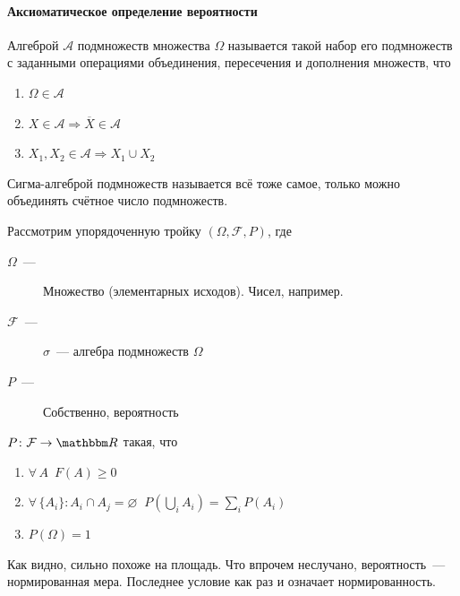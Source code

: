 \documentclass[12pt,timbord]{../../../notes}
\begin{document}
\paragraph{Аксиоматическое определение вероятности}
\label{par:prob::ax}

\begin{defn}\label{defn:prob::ax::sigmalg}
  Алгеброй $\mathcal A$ подмножеств множества $\Omega$ называется такой набор его подмножеств с
  заданными операциями объединения, пересечения и дополнения множеств, что
  \begin{enumerate}
    \item $\Omega \in \mathcal A$
    \item $X\in \mathcal A \Rightarrow \overline{X} \in \mathcal A$
    \item $X_1, X_2 \in \mathcal A \Rightarrow X_1 \cup X_2$
  \end{enumerate}

  Сигма-алгеброй подмножеств называется всё тоже самое, только можно объединять счётное число
  подмножеств.
\end{defn}
\begin{defn}\label{defn:prob::ax::probspace}
  Рассмотрим упорядоченную тройку $(\Omega, \mathcal F, P)$, где
  \begin{description}
    \item[$\Omega$~---] Множество (элементарных исходов). Чисел, например.
    \item[$\mathcal F$~---] $\sigma$~--- алгебра подмножеств $\Omega$
    \item[$P$~---] Собственно, вероятность
  \end{description}
\end{defn}

\begin{defn}[Вероятность]\label{defn:prob::ax::probdef}
  $P\colon \mathcal F \to \R$ такая, что
  \begin{enumerate}
    \item $\forall\, A\;\: F(A) \geqslant 0$
    \item $\forall\, \{A_i\}\colon A_i \cap A_j = \varnothing 
      \;\; P\left(\bigcup_i A_i\right) = \sum_i P(A_i)$
    \item $P(\Omega) = 1$
  \end{enumerate}
  Как видно, сильно похоже на площадь. Что впрочем неслучано, вероятность~--- нормированная мера.
  Последнее условие как раз и означает нормированность. 
\end{defn}
\end{document}
